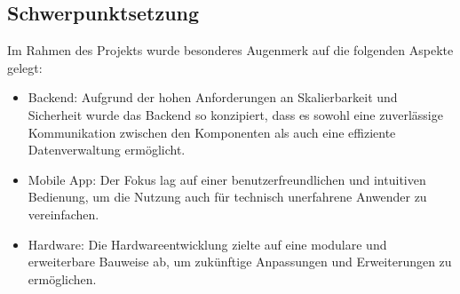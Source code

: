 \subsection{Schwerpunktsetzung}

Im Rahmen des Projekts wurde besonderes Augenmerk auf die folgenden Aspekte gelegt:

\begin{itemize}
  \item Backend: Aufgrund der hohen Anforderungen an Skalierbarkeit und Sicherheit wurde das Backend so konzipiert, dass es sowohl eine zuverlässige Kommunikation zwischen den Komponenten als auch eine effiziente Datenverwaltung ermöglicht.
  \item Mobile App: Der Fokus lag auf einer benutzerfreundlichen und intuitiven Bedienung, um die Nutzung auch für technisch unerfahrene Anwender zu vereinfachen.
  \item Hardware: Die Hardwareentwicklung zielte auf eine modulare und erweiterbare Bauweise ab, um zukünftige Anpassungen und Erweiterungen zu ermöglichen.
\end{itemize}
